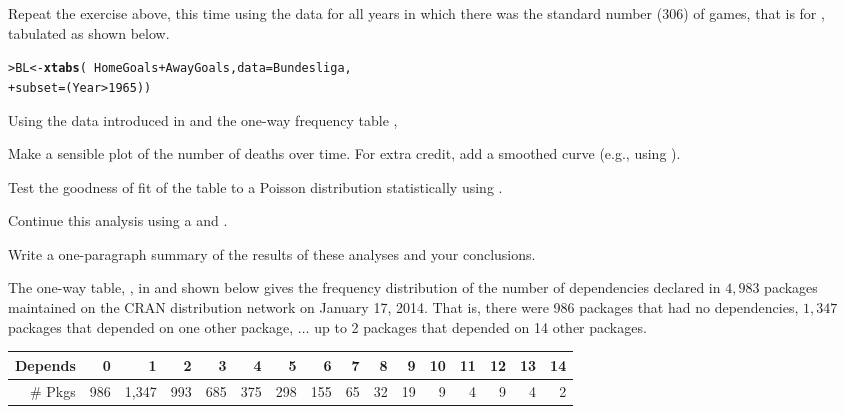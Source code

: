 \documentclass[11pt]{report}\usepackage[]{graphicx}\usepackage[]{color}
\makeatletter
\newcommand{\hlnum}[1]{\textcolor[rgb]{0.686,0.059,0.569}{#1}}%
\newcommand{\hlopt}[1]{\textcolor[rgb]{0,0,0}{#1}}%
\newcommand{\hlstd}[1]{\textcolor[rgb]{0.345,0.345,0.345}{#1}}%
\newcommand{\hlkwb}[1]{\textcolor[rgb]{0.69,0.353,0.396}{#1}}%
\newcommand{\hlkwc}[1]{\textcolor[rgb]{0.333,0.667,0.333}{#1}}%
\newcommand{\hlkwd}[1]{\textcolor[rgb]{0.737,0.353,0.396}{\textbf{#1}}}%
\newenvironment{kframe}{%
 \def\at@end@of@kframe{}%
 \ifinner\ifhmode%
  \def\at@end@of@kframe{\end{minipage}}%
  \begin{minipage}{\columnwidth}%
 \fi\fi%
 \def\FrameCommand##1{\hskip\@totalleftmargin \hskip-\fboxsep
 \colorbox{shadecolor}{##1}\hskip-\fboxsep
     \hskip-\linewidth \hskip-\@totalleftmargin \hskip\columnwidth}%
 \MakeFramed {\advance\hsize-\width
   \@totalleftmargin\z@ \linewidth\hsize
   \@setminipage}}%
 {\par\unskip\endMakeFramed%
 \at@end@of@kframe}
\newenvironment{knitrout}{}{} %
\renewenvironment{knitrout}{\small\renewcommand{\baselinestretch}{.85}}{} %
\makeatother
\begin{document}
\begin{Exercises}
  \exercise\exhard
  Repeat the exercise above, this time using the data for all years in which there was
  the standard number (306) of games, that is for , tabulated as shown below.
\begin{knitrout}
\color{fgcolor}\begin{kframe}
\begin{alltt}
\hlstd{> }\hlstd{BL} \hlkwb{<-} \hlkwd{xtabs}\hlstd{(}\hlopt{~} \hlstd{HomeGoals} \hlopt{+} \hlstd{AwayGoals,} \hlkwc{data} \hlstd{= Bundesliga,}
\hlstd{+ }            \hlkwc{subset} \hlstd{= (Year} \hlopt{>} \hlnum{1965}\hlstd{))}
\end{alltt}
\end{kframe}
\end{knitrout}



\exercise Using the data  introduced in 
and the one-way frequency table , %
  \begin{enumerate*}
    \item Make a sensible plot of the number of deaths over time. For extra credit,
    add a smoothed curve (e.g., using ).
    \item Test the goodness of fit of the table  to
    a Poisson distribution statistically using .
    \item Continue this analysis using a  and .
    \item Write a one-paragraph summary of the results of these analyses and your
    conclusions.
  \end{enumerate*}

\exercise\exhard
  The one-way table, , in  and shown below gives the frequency
  distribution of the number of dependencies declared in $4,983$ \R packages
  maintained on the CRAN distribution network on January 17, 2014. That is, there were 986
  packages that had no dependencies, $1,347$ packages that depended on one other package, $\dots$
  up to 2 packages that depended on 14 other packages.

\begin{table}[ht]
\centering
\begin{tabular}{r|rrrrrrrrrrrrrrr}
  \hline
Depends & 0 & 1 & 2 & 3 & 4 & 5 & 6 & 7 & 8 & 9 & 10 & 11 & 12 & 13 & 14 \\
  \hline
\# Pkgs & 986 & 1,347 & 993 & 685 & 375 & 298 & 155 &  65 &  32 &  19 &   9 &   4 &   9 &   4 &   2 \\
   \hline
\end{tabular}
\end{table}


\end{Exercises}
\end{document}
